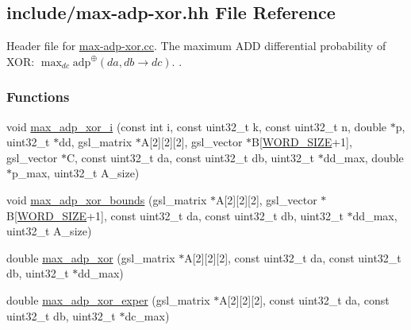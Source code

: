 \hypertarget{max-adp-xor_8hh}{\subsection{include/max-\/adp-\/xor.hh \-File \-Reference}
\label{max-adp-xor_8hh}
}


\-Header file for \hyperlink{max-adp-xor_8cc}{max-\/adp-\/xor.\-cc}. \-The maximum \-A\-D\-D differential probability of \-X\-O\-R\-: $\max_{dc} \mathrm{adp}^{\oplus}(da, db \rightarrow dc)$. .  


\subsubsection*{\-Functions}
\begin{DoxyCompactItemize}
\item 
void \hyperlink{max-adp-xor_8hh_a2c8bd5dba3223b07f3606c2240d0a4b2}{max\-\_\-adp\-\_\-xor\-\_\-i} (const int i, const uint32\-\_\-t k, const uint32\-\_\-t n, double $\ast$p, uint32\-\_\-t $\ast$dd, gsl\-\_\-matrix $\ast$\-A\mbox{[}2\mbox{]}\mbox{[}2\mbox{]}\mbox{[}2\mbox{]}, gsl\-\_\-vector $\ast$\-B\mbox{[}\hyperlink{common_8hh_a92ed8507d1cd2331ad09275c5c4c1c89}{\-W\-O\-R\-D\-\_\-\-S\-I\-Z\-E}+1\mbox{]}, gsl\-\_\-vector $\ast$\-C, const uint32\-\_\-t da, const uint32\-\_\-t db, uint32\-\_\-t $\ast$dd\-\_\-max, double $\ast$p\-\_\-max, uint32\-\_\-t \-A\-\_\-size)
\item 
void \hyperlink{max-adp-xor_8hh_ab44746fae93c11ea36bd24f4f874669d}{max\-\_\-adp\-\_\-xor\-\_\-bounds} (gsl\-\_\-matrix $\ast$\-A\mbox{[}2\mbox{]}\mbox{[}2\mbox{]}\mbox{[}2\mbox{]}, gsl\-\_\-vector $\ast$\-B\mbox{[}\hyperlink{common_8hh_a92ed8507d1cd2331ad09275c5c4c1c89}{\-W\-O\-R\-D\-\_\-\-S\-I\-Z\-E}+1\mbox{]}, const uint32\-\_\-t da, const uint32\-\_\-t db, uint32\-\_\-t $\ast$dd\-\_\-max, uint32\-\_\-t \-A\-\_\-size)
\item 
double \hyperlink{max-adp-xor_8hh_aa66f59ae4d29988f90f525ce600d6045}{max\-\_\-adp\-\_\-xor} (gsl\-\_\-matrix $\ast$\-A\mbox{[}2\mbox{]}\mbox{[}2\mbox{]}\mbox{[}2\mbox{]}, const uint32\-\_\-t da, const uint32\-\_\-t db, uint32\-\_\-t $\ast$dd\-\_\-max)
\item 
double \hyperlink{max-adp-xor_8hh_a7b91b512d304a58a701f631be1f863a1}{max\-\_\-adp\-\_\-xor\-\_\-exper} (gsl\-\_\-matrix $\ast$\-A\mbox{[}2\mbox{]}\mbox{[}2\mbox{]}\mbox{[}2\mbox{]}, const uint32\-\_\-t da, const uint32\-\_\-t db, uint32\-\_\-t $\ast$dc\-\_\-max)
\end{DoxyCompactItemize}


